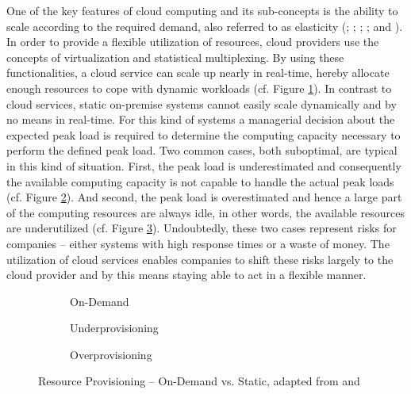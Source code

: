 One of the key features of cloud computing and its sub-concepts is the ability to scale according to the required demand, also referred to as elasticity (\citealp[p. 4]{Foster2008}; \citealp[pp. 52-54]{Armbrust2010}; \citealp[p. 126]{Iyer2010}; \citealp[pp. 9-10]{Zhang2010}; and \citealp[p. 2]{Mell2011}). In order to provide a flexible utilization of resources, cloud providers use the concepts of virtualization and statistical multiplexing. By using these functionalities, a cloud service can scale up nearly in real-time, hereby allocate enough resources to cope with dynamic workloads (cf. Figure \ref{fig:rpc}). In contrast to cloud services, static on-premise systems cannot easily scale dynamically and by no means in real-time. For this kind of systems a managerial decision about the expected peak load is required to determine the computing capacity necessary to perform the defined peak load. Two common cases, both suboptimal, are typical in this kind of situation. First, the peak load is underestimated and consequently the available computing capacity is not capable to handle the actual peak loads (cf. Figure \ref{fig:rpu}). And second, the peak load is overestimated and hence a large part of the computing resources are always idle, in other words, the available resources are underutilized (cf. Figure \ref{fig:rpo}). Undoubtedly, these two cases represent risks for companies -- either systems with high response times or a waste of money. The utilization of cloud services enables companies to shift these risks largely to the cloud provider and by this means staying able to act in a flexible manner.

\begin{figure}[bht]
	\centering
	\begin{subfigure}{.75\textwidth}
		\centering
		
		\caption{On-Demand}\label{fig:rpc}
	\end{subfigure}
	\begin{subfigure}[b]{.75\textwidth}
		\centering
		
		\caption{Underprovisioning}\label{fig:rpu}
	\end{subfigure}
	\begin{subfigure}[b]{.75\textwidth}
		\centering
		
		\caption{Overprovisioning}\label{fig:rpo}
	\end{subfigure}
	\caption[Resource Provisioning -- On-Demand vs. Static]{Resource Provisioning -- On-Demand vs. Static, adapted from \citet[p. 54]{Armbrust2010} and \citet[p. 127]{Iyer2010}}
	\label{fig:rp}
\end{figure}

